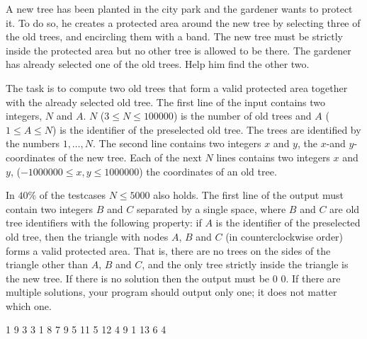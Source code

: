 

A new tree has been planted in the city park and the gardener wants to protect it. To do so, he creates a protected area around the new tree by selecting three of the old trees, and encircling them with a band. The new tree must be strictly inside the protected area but no other tree is allowed to be there. The gardener has already selected one of the old trees. Help him find the other two.

The task is to compute two old trees that form a valid protected area together with the already selected old tree.
The first line of the input contains two integers, $N$ and $A$. $N$ ($3 \leq N \leq 100000$) is the number of old trees and $A$ ($1 \leq A \leq N$) is the identifier of the preselected old tree. The trees are identified by the numbers $1,\ldots,N$. The second line contains two integers $x$ and $y$, the $x$-and $y$-coordinates of the new tree. Each of the next $N$ lines contains two integers $x$ and $y$, ($-1000000 \leq x,y \leq 1000000$) the coordinates of an old tree.

\bigskip
In $40 \%$ of the testcases $N \leq 5000$ also holds.
The first line of the output must contain two integers $B$ and $C$ separated by a single space, where $B$ and $C$ are old tree identifiers with the following property: if $A$ is the identifier of the preselected old tree, then the triangle with nodes $A$, $B$ and $C$ (in counterclockwise order) forms a valid protected area. That is, there are no trees on the sides of the triangle other than $A$, $B$ and $C$, and the only tree strictly inside the triangle is the new tree.
If there is no solution then the output must be 0 0. If there are multiple solutions, your program should output only one; it does not matter which one.

 1
9 3
3 1
8 7
9 5
11 5
12 4
9 1
13 6
 4
\sampleCOMMENT

\sampleEND
\bigskip

